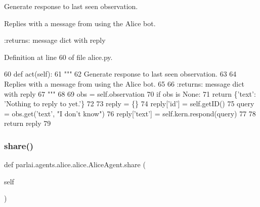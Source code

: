 \begin{DoxyVerb}Generate response to last seen observation.

Replies with a message from using the Alice bot.

:returns: message dict with reply
\end{DoxyVerb}
 

Definition at line 60 of file alice.\+py.


\begin{DoxyCode}
60     \textcolor{keyword}{def }act(self):
61         \textcolor{stringliteral}{"""}
62 \textcolor{stringliteral}{        Generate response to last seen observation.}
63 \textcolor{stringliteral}{}
64 \textcolor{stringliteral}{        Replies with a message from using the Alice bot.}
65 \textcolor{stringliteral}{}
66 \textcolor{stringliteral}{        :returns: message dict with reply}
67 \textcolor{stringliteral}{        """}
68 
69         obs = self.observation
70         \textcolor{keywordflow}{if} obs \textcolor{keywordflow}{is} \textcolor{keywordtype}{None}:
71             \textcolor{keywordflow}{return} \{\textcolor{stringliteral}{'text'}: \textcolor{stringliteral}{'Nothing to reply to yet.'}\}
72 
73         reply = \{\}
74         reply[\textcolor{stringliteral}{'id'}] = self.getID()
75         query = obs.get(\textcolor{stringliteral}{'text'}, \textcolor{stringliteral}{"I don't know"})
76         reply[\textcolor{stringliteral}{'text'}] = self.kern.respond(query)
77 
78         \textcolor{keywordflow}{return} reply
79 \end{DoxyCode}
\mbox{\label{classparlai_1_1agents_1_1alice_1_1alice_1_1AliceAgent_a1ed8fa0a0fba59ae248ceee848eb88d9}} 
\subsubsection{\texorpdfstring{share()}{share()}}
{\footnotesize\ttfamily def parlai.\+agents.\+alice.\+alice.\+Alice\+Agent.\+share (\begin{DoxyParamCaption}\item[{}]{self }\end{DoxyParamCaption})}



